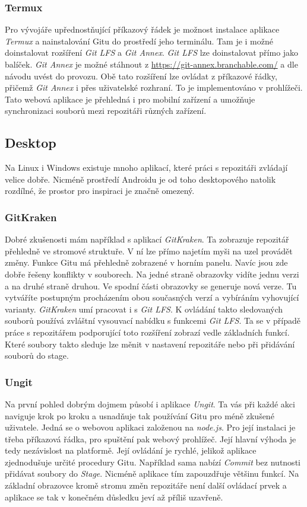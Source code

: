     \subsubsection{Termux}
    Pro vývojáře upřednostňující příkazový řádek je možnost instalace aplikace \emph{Termux} a nainstalování Gitu do prostředí jeho terminálu. Tam je i možné doinstalovat rozšíření \emph{Git LFS} a \emph{Git Annex}. \emph{Git LFS} lze doinstalovat přímo jako balíček. \emph{Git Annex} je možné stáhnout z \url{https://git-annex.branchable.com/} a dle návodu uvést do provozu. Obě tato rozšíření lze ovládat z příkazové řádky, přičemž \emph{Git Annex} i přes uživatelské rozhraní. To je implementováno v prohlížeči. Tato webová aplikace je přehledná i pro mobilní zařízení a umožňuje synchronizaci souborů mezi repozitáři různých zařízení.

    \subsection {Desktop}
    Na Linux i Windows existuje mnoho aplikací, které práci s repozitáři zvládají velice dobře. Nicméně prostředí Androidu je od toho desktopového natolik rozdílné, že prostor pro inspiraci je značně omezený.
        \subsubsection{GitKraken}
        Dobré zkušenosti mám například s aplikací \emph{GitKraken}. Ta zobrazuje repozitář přehledně ve stromové struktuře. V ní lze přímo najetím myši na uzel provádět změny. Funkce Gitu má přehledně zobrazené v horním panelu. Navíc jsou zde dobře řešeny konflikty v souborech. Na jedné straně obrazovky vidíte jednu verzi a na druhé straně druhou. Ve spodní části obrazovky se generuje nová verze. Tu vytváříte postupným procházením obou současných verzí a vybíráním vyhovující varianty. \emph{GitKraken} umí pracovat i s \emph{Git LFS}. K ovládání takto sledovaných souborů používá zvláštní vysouvací nabídku s funkcemi \emph{Git LFS}. Ta se v případě práce s repozitářem podporující toto rozšíření zobrazí vedle základních funkcí. Které soubory takto sleduje lze měnit v nastavení repozitáře nebo při přidávání souborů do stage.

        \subsubsection{Ungit}
        Na první pohled dobrým dojmem působí i aplikace \emph{Ungit}. Ta vás při každé akci naviguje krok po kroku a usnadňuje tak používání Gitu pro méně zkušené uživatele. Jedná se o webovou aplikaci založenou na \emph{node.js}. Pro její instalaci je třeba příkazová řádka, pro spuštění pak webový prohlížeč. Její hlavní výhoda je tedy nezávislost na platformě. Její ovládání je rychlé, jelikož aplikace zjednodušuje určité procedury Gitu. Například sama nabízí \emph{Commit} bez nutnosti přidávat soubory do \emph{Stage}. Nicméně aplikace tím zapouzdřuje většinu funkcí. Na základní obrazovce kromě stromu změn repozitáře není další ovládací prvek a aplikace se tak v konečném důsledku jeví až příliš uzavřeně.

